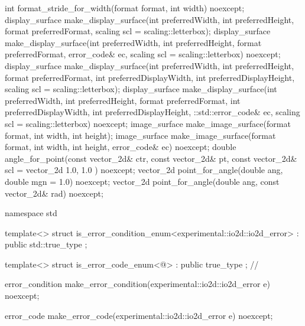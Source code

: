 \begin{codeblock}
{{{{  int format_stride_for_width(format format, int width) noexcept;
  display_surface make_display_surface(int preferredWidth,
    int preferredHeight, format preferredFormat,
    scaling scl = scaling::letterbox);
  display_surface make_display_surface(int preferredWidth,
    int preferredHeight, format preferredFormat, error_code& ec,
    scaling scl = scaling::letterbox) noexcept;
  display_surface make_display_surface(int preferredWidth,
    int preferredHeight, format preferredFormat, int preferredDisplayWidth, 
    int preferredDisplayHeight, scaling scl = scaling::letterbox);
  display_surface make_display_surface(int preferredWidth,
    int preferredHeight, format preferredFormat, int preferredDisplayWidth, 
    int preferredDisplayHeight, ::std::error_code& ec,
    scaling scl = scaling::letterbox) noexcept;
  image_surface make_image_surface(format format, int width, int height);
  image_surface make_image_surface(format format, int width, int height, 
    error_code& ec) noexcept;
  double angle_for_point(const vector_2d& ctr, const vector_2d& pt,
    const vector_2d& scl = vector_2d{ 1.0, 1.0 }) noexcept;
  vector_2d point_for_angle(double ang, double mgn = 1.0) noexcept;
  vector_2d point_for_angle(double ang, const vector_2d& rad) noexcept;
} } } }

namespace std {
  template<>
  struct is_error_condition_enum<experimental::io2d::io2d_error>
    : public std::true_type{ };

  template<>
  struct is_error_code_enum<@\impdef@>
    : public true_type{ }; // \expos

  error_condition make_error_condition(experimental::io2d::io2d_error e) 
    noexcept;

  error_code make_error_code(experimental::io2d::io2d_error e) noexcept;
}

\end{codeblock}
%
